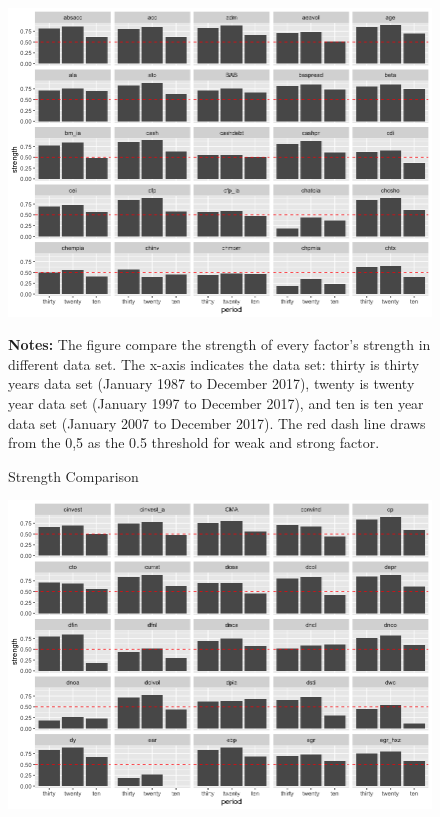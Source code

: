 \begin{landscape}
\begin{figure}[ht]\caption{Strength Comparison}\label{figure:strength_compare}
			\centering
				\includegraphics[scale = 0.7]{strength_comparison_I}
			\begin{minipage}{\textwidth}
	{\footnotesize {\bf Notes:} The figure compare the strength of every factor's strength in different data set. The x-axis indicates the data set: thirty is thirty years data set (January 1987 to December 2017), twenty is twenty year data set (January 1997 to December 2017), and ten is ten year data set (January 2007 to December 2017). The red dash line draws from the 0,5 as the 0.5 threshold for weak and strong factor.}
			\end{minipage}
\end{figure}
\end{landscape}



\begin{landscape}
	\begin{figure}[ht]
		\includegraphics[scale = 0.7]{strength_comparison_II}
		\centering
	\end{figure}
\end{landscape}

